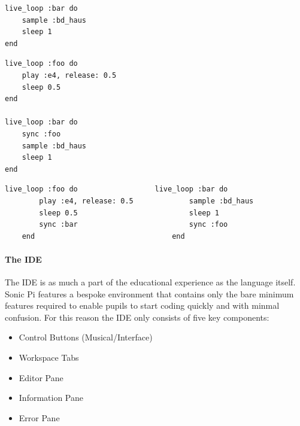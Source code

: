 \documentclass[11pt, abstracton, twoside, titlepage=true]{scrartcl}
\begin{document}
\begin{multicols}{2}
\begin{minipage}{0.5\textwidth}
\begin{minipage}{\textwidth}
\begin{lstlisting}[style = sonicpi]
live_loop :bar do
    sample :bd_haus
    sleep 1
end
			\end{lstlisting}
			 \label{outofsync}
		\end{minipage}
		\begin{minipage}{\textwidth}
			\begin{lstlisting}[style = sonicpi]
live_loop :foo do
    play :e4, release: 0.5
    sleep 0.5
end

live_loop :bar do
    sync :foo
    sample :bd_haus
    sleep 1
end
			\end{lstlisting}
			 \label{synced}
		\end{minipage}

	\end{minipage}
\end{multicols}

\begin{minipage}{\textwidth}
	\begin{lstlisting}[style = sonicpi]
    live_loop :foo do                  live_loop :bar do
        play :e4, release: 0.5             sample :bd_haus
        sleep 0.5                          sleep 1
        sync :bar                          sync :foo
    end                                end
	\end{lstlisting}
\end{minipage}

\paragraph{The IDE}
The IDE is as much a part of the educational experience as the language 
itself. Sonic Pi features a bespoke environment that contains only the bare 
minimum features required to enable pupils to start coding quickly and with 
minmal confusion. For this reason the IDE only consists of five key components:
\newpage
\begin{itemize}
	\item Control Buttons (Musical/Interface)
	\item Workspace Tabs
	\item Editor Pane
	\item Information Pane
	\item Error Pane
\end{itemize}
\end{document}
